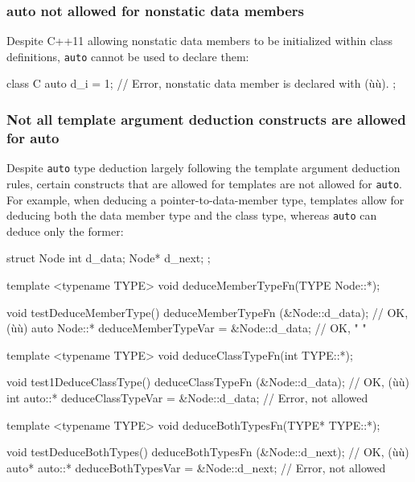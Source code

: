 \subsubsection[\lstinline!auto! not allowed for nonstatic data members]{{\SubsubsecCode auto} not allowed for nonstatic data members}\label{auto-not-allowed-for-non-static-data-members}

Despite C++11 allowing nonstatic data members to be initialized within
class definitions, \lstinline!auto! cannot be used to declare them:

\begin{emcppslisting}
class C
{
    auto d_i = 1;  // Error, nonstatic data member is declared with (ù{}ù).
};
\end{emcppslisting}
    

\subsubsection[Not all template argument deduction constructs are allowed for \lstinline!auto!]{Not all template argument deduction constructs are allowed for {\SubsubsecCode auto}}\label{not-all-template-argument-deduction-constructs-are-allowed-for-auto}

Despite \lstinline!auto! type deduction largely following the template
argument deduction rules, certain constructs that are allowed for
templates are not allowed for \lstinline!auto!. For example, when deducing
a pointer-to-data-member type, templates allow for deducing both the
data member type and the class type, whereas \lstinline!auto! can 
deduce only the former:

\begin{emcppslisting}
struct Node
{
    int   d_data;
    Node* d_next;
};

template <typename TYPE>
void deduceMemberTypeFn(TYPE Node::*);

void testDeduceMemberType()
{
                 deduceMemberTypeFn   (&Node::d_data);  // OK, (ù{}ù)
    auto Node::* deduceMemberTypeVar = &Node::d_data;   // OK,   "     "
}

template <typename TYPE>
void deduceClassTypeFn(int TYPE::*);

void test1DeduceClassType()
{
                deduceClassTypeFn   (&Node::d_data);  // OK, (ù{}ù)
    int auto::* deduceClassTypeVar = &Node::d_data;   // Error, not allowed
}

template <typename TYPE>
void deduceBothTypesFn(TYPE* TYPE::*);

void testDeduceBothTypes()
{
                  deduceBothTypesFn   (&Node::d_next);  // OK, (ù{}ù)
    auto* auto::* deduceBothTypesVar = &Node::d_next;   // Error, not allowed
}
\end{emcppslisting}
    
